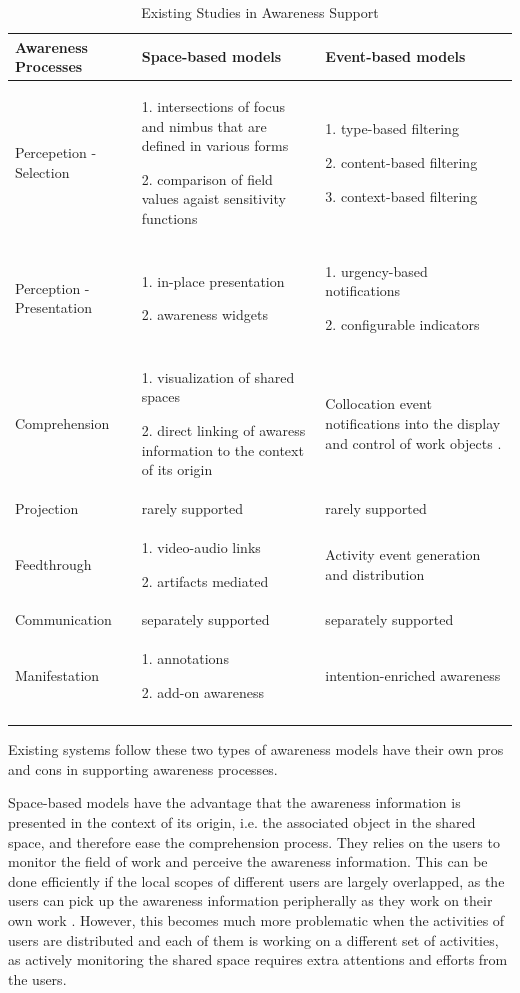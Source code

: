 {\footnotesize
\begin{longtable}{>{\raggedright}p{1.1in}>{\raggedright}p{2.2in}>{\raggedright}p{2.2in}}
\toprule 
\textbf{Awareness Processes} & \textbf{Space-based models} & \textbf{Event-based models}\tabularnewline
\midrule 
Percepetion - Selection & 1. intersections of focus and nimbus that are defined in various forms
\cite{Rodden1996,Sandor1997,Benford1993}

2. comparison of field values agaist sensitivity functions \cite{simone2002a} & 1. type-based filtering \cite{Fuchs1995}

2. content-based filtering \cite{Fitzpatrick2002}

3. context-based filtering \cite{Gross2004}\tabularnewline
\midrule 
Perception - Presentation & 1. in-place presentation \cite{Berlage1999}

2. awareness widgets \cite{Gutwin1996,Erickson1999} & 1. urgency-based notifications \cite{Fuchs1995,sohlenkamp2000po}

2. configurable indicators \cite{prinz1999a}\tabularnewline
\midrule 
Comprehension & 1. visualization of shared spaces

2. direct linking of awaress information to the context of its origin & Collocation event notifications into the display and control of work
objects \cite{prinz1999a,carroll2003a}.\tabularnewline
\midrule 
Projection & rarely supported & rarely supported\tabularnewline
\midrule 
Feedthrough & 1. video-audio links \cite{Dourish1992}

2. artifacts mediated \cite{Tee2009} & Activity event generation and distribution \cite{Fuchs1995}\tabularnewline
\midrule 
Communication & separately supported & separately supported\tabularnewline
\midrule 
Manifestation & 1. annotations \cite{Zheng2006,Weng2004}

2. add-on awareness \cite{simone2002a} & intention-enriched awareness \cite{Rittenbruch2007}\tabularnewline
\bottomrule
\caption{Existing Studies in Awareness Support}
\label{tab:existing_studies}

\end{longtable}
}

Existing systems follow these two types of awareness models have their own pros and cons in supporting awareness processes. 

Space-based models have the advantage that the awareness information is presented in the context of its origin, i.e. the associated object in the shared space, and therefore ease the comprehension process. They relies on the users to monitor the field of work and perceive the awareness information. This can be done efficiently if the local scopes of different users are largely overlapped, as the users can pick up the awareness information peripherally as they work on their own work \cite{schmidt2002a}. However, this becomes much more problematic when the activities of users are distributed and each of them is working on a different set of activities, as actively monitoring the shared space requires extra attentions and efforts from the users. 

